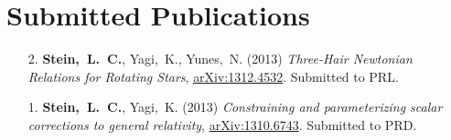 
\section{\sc Submitted Publications}
\begin{enumerate}
\item[{2.}] {\bf Stein,~L.~C.}, Yagi,~K., Yunes,~N. (2013)
  {\it Three-Hair Newtonian Relations for Rotating Stars},
  \href{http://arxiv.org/abs/1312.4532}{arXiv:1312.4532}. Submitted to PRL.
\item[{1.}] {\bf Stein,~L.~C.}, Yagi,~K. (2013)
  {\it Constraining and parameterizing scalar corrections to general relativity},
  \href{http://arxiv.org/abs/1310.6743}{arXiv:1310.6743}. Submitted to PRD.
\end{enumerate}

